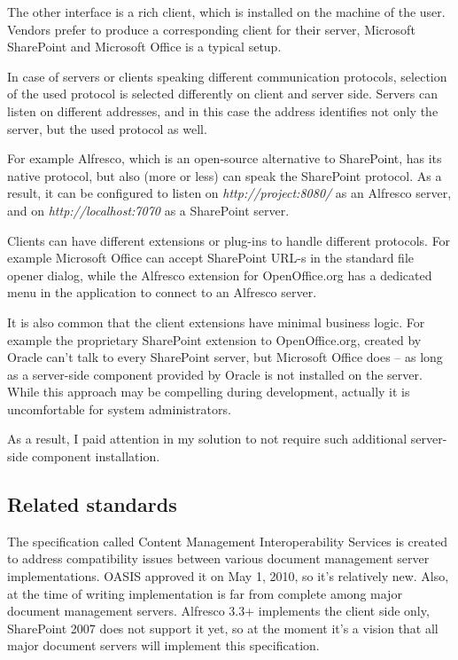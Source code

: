 The other interface is a rich client, which is installed on the machine of the
user. Vendors prefer to produce a corresponding client for their server,
Microsoft SharePoint and Microsoft Office is a typical setup.

In case of servers or clients speaking different communication protocols,
selection of the used protocol is selected differently on client and server
side. Servers can listen on different addresses, and in this case the address
identifies not only the server, but the used protocol as well.

For example Alfresco\cite{alfresco}, which is an open-source alternative to
SharePoint, has its native protocol, but also (more or less) can speak the
SharePoint protocol. As a result, it can be configured to listen on
\emph{http://project:8080/} as an Alfresco server, and on
\emph{http://localhost:7070} as a SharePoint server.

Clients can have different extensions or plug-ins to handle different
protocols. For example Microsoft Office can accept SharePoint URL-s in the
standard file opener dialog, while the Alfresco extension for OpenOffice.org
has a dedicated menu in the application to connect to an Alfresco server.

It is also common that the client extensions have minimal business logic. For
example the proprietary SharePoint extension to OpenOffice.org, created by
Oracle can't talk to every SharePoint server, but Microsoft Office does -- as
long as a server-side component provided by Oracle is not installed on the
server. While this approach may be compelling during development, actually it
is uncomfortable for system administrators.

As a result, I paid attention in my solution to not require such additional
server-side component installation.

\subsection{Related standards}

The specification called Content Management Interoperability
Services\cite{cmis} is created to address compatibility issues between various
document management server implementations. OASIS approved it on May 1, 2010,
so it's relatively new. Also, at the time of writing implementation is far from
complete among major document management servers. Alfresco 3.3+ implements the
client side only, SharePoint 2007 does not support it yet, so at the moment
it's a vision that all major document servers will implement this
specification.

